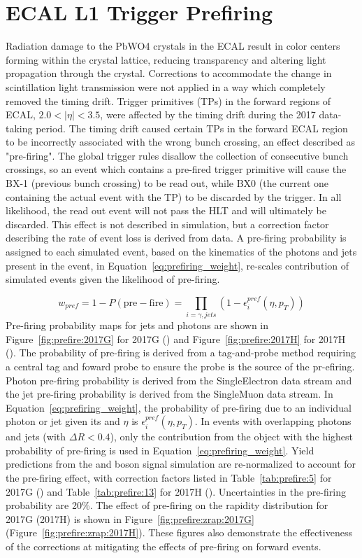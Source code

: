 \section{ECAL L1 Trigger Prefiring}\label{ch:prefire}
Radiation damage to the PbWO4 crystals in the ECAL result in color centers forming within the crystal lattice, reducing transparency and altering light propagation through the crystal. Corrections to accommodate the change in scintillation light transmission were not applied in a way which completely removed the timing drift. Trigger primitives (TPs) in the forward regions of ECAL, $2.0 < |\eta| < 3.5$, were affected by the timing drift during the 2017 data-taking period. The timing drift caused certain TPs in the forward ECAL region to be incorrectly associated with the wrong bunch crossing, an effect described as "pre-firing". The global trigger rules disallow the collection of consecutive bunch crossings, so an event which contains a pre-fired trigger primitive will cause the BX-1 (previous bunch crossing) to be read out, while BX0 (the current one containing the actual event with the TP) to be discarded by the trigger. In all likelihood, the read out event will not pass the HLT and will ultimately be discarded.
This effect is not described in simulation, but a correction factor describing the rate of event loss is derived from data. A pre-firing probability is assigned to each simulated event, based on the kinematics of the photons and jets present in the event, in Equation~\ref{eq:prefiring_weight}, re-scales contribution of simulated events given the likelihood of pre-firing.

\begin{equation}
    w_{pref} = 1 - P(\mathrm{pre-fire}) = \prod_{i=\gamma,jets}{(1 - \epsilon_i^{pref}(\eta,p_T))}
    \label{eq:prefiring_weight}
\end{equation}
Pre-firing probability maps for jets and photons are shown in Figure~\ref{fig:prefire:2017G} for 2017G (\serag) and Figure~\ref{fig:prefire:2017H} for 2017H (\serah). The probability of pre-firing is derived from a tag-and-probe method requiring a central tag and foward probe to ensure the probe is the source of the pr-efiring. Photon pre-firing probability is derived from the SingleElectron data stream and the jet pre-firing probability is derived from the SingleMuon data stream. In Equation~\ref{eq:prefiring_weight}, the probability of pre-firing due to an individual photon or jet given its \pt and $\eta$ is $\epsilon_i^{pref}(\eta,p_T)$. In events with overlapping photons and jets (with $\Delta  R < 0.4$), only the contribution from the object with the highest probability of pre-firing is used in Equation~\ref{eq:prefiring_weight}\cite{LATHOMAS}. Yield predictions from the \Wpm and \Z boson signal simulation are re-normalized to account for the pre-firing effect, with correction factors listed in Table~\ref{tab:prefire:5} for 2017G (\serag) and Table~\ref{tab:prefire:13} for 2017H (\serah). Uncertainties in the pre-firing probability are 20\%. The effect of pre-firing on the \zee rapidity distribution for 2017G (2017H) is shown in  Figure~\ref{fig:prefire:zrap:2017G} (Figure~\ref{fig:prefire:zrap:2017H}). These figures also demonstrate the effectiveness of the corrections at mitigating the effects of pre-firing on forward events.


